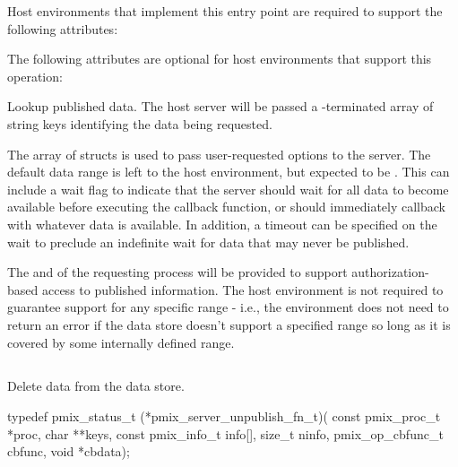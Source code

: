 
\divider

Host environments that implement this entry point are required to support the following attributes:


\reqattrend

\optattrstart
The following attributes are optional for host environments that support this operation:


\optattrend


\descr

Lookup published data.
The host server will be passed a -terminated array of string keys identifying the data being requested.

The array of  structs is used to pass user-requested options to the server. The default data range is left to the host environment, but expected to be .
This can include a wait flag to indicate that the server should wait for all data to become available before executing the callback function, or should immediately callback with whatever data is available.
In addition, a timeout can be specified on the wait to preclude an indefinite wait for data that may never be published.

\advicermstart
The  and  of the requesting process will be provided to support authorization-based access to published information. The host environment is not required to guarantee support for any specific range - i.e., the environment does not need to return an error if the data store doesn't support a specified range so long as it is covered by some internally defined range.
\advicermend

\subsection{}

\summary

Delete data from the data store.

\format

\cspecificstart
\begin{codepar}
typedef pmix_status_t (*pmix_server_unpublish_fn_t)(
                             const pmix_proc_t *proc,
                             char **keys,
                             const pmix_info_t info[],
                             size_t ninfo,
                             pmix_op_cbfunc_t cbfunc,
                             void *cbdata);
\end{codepar}
\cspecificend

